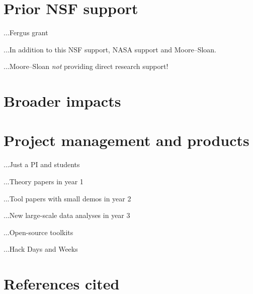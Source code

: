 \documentclass[12pt]{article}
\begin{document}
\section*{Prior NSF support}

...Fergus grant

...In addition to this NSF support, NASA support and Moore--Sloan.

...Moore--Sloan \emph{not} providing direct research support!

\section*{Broader impacts}

\section*{Project management and products}

...Just a PI and students

...Theory papers in year 1

...Tool papers with small demos in year 2

...New large-scale data analyses in year 3

...Open-source toolkits

...Hack Days and Weeks

\section*{References cited}
\end{document}
